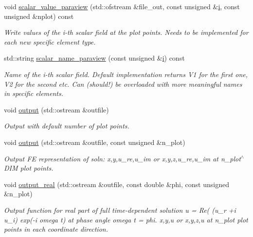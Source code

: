 \begin{DoxyCompactItemize}
void \hyperlink{classoomph_1_1HelmholtzEquations_a7387cf17f2925a89a4ac9de760c4b359}{scalar\+\_\+value\+\_\+paraview} (std\+::ofstream \&file\+\_\+out, const unsigned \&\hyperlink{cfortran_8h_adb50e893b86b3e55e751a42eab3cba82}{i}, const unsigned \&nplot) const
\begin{DoxyCompactList}\small\item\em Write values of the i-\/th scalar field at the plot points. Needs to be implemented for each new specific element type. \end{DoxyCompactList}\item 
std\+::string \hyperlink{classoomph_1_1HelmholtzEquations_a19eb3c554208f7136c5a3a7703e94693}{scalar\+\_\+name\+\_\+paraview} (const unsigned \&\hyperlink{cfortran_8h_adb50e893b86b3e55e751a42eab3cba82}{i}) const
\begin{DoxyCompactList}\small\item\em Name of the i-\/th scalar field. Default implementation returns V1 for the first one, V2 for the second etc. Can (should!) be overloaded with more meaningful names in specific elements. \end{DoxyCompactList}\item 
void \hyperlink{classoomph_1_1HelmholtzEquations_ad06140cef8a602246cf45f1b38d201e3}{output} (std\+::ostream \&outfile)
\begin{DoxyCompactList}\small\item\em Output with default number of plot points. \end{DoxyCompactList}\item 
void \hyperlink{classoomph_1_1HelmholtzEquations_a63c04aa6b9ee38cb75417b2de9e45f24}{output} (std\+::ostream \&outfile, const unsigned \&n\+\_\+plot)
\begin{DoxyCompactList}\small\item\em Output FE representation of soln\+: x,y,u\+\_\+re,u\+\_\+im or x,y,z,u\+\_\+re,u\+\_\+im at n\+\_\+plot$^\wedge$\+D\+IM plot points. \end{DoxyCompactList}\item 
void \hyperlink{classoomph_1_1HelmholtzEquations_a391092039be116f402d1495284b49e1e}{output\+\_\+real} (std\+::ostream \&outfile, const double \&phi, const unsigned \&n\+\_\+plot)
\begin{DoxyCompactList}\small\item\em Output function for real part of full time-\/dependent solution u = Re( (u\+\_\+r +i u\+\_\+i) exp(-\/i omega t) at phase angle omega t = phi. x,y,u or x,y,z,u at n\+\_\+plot plot points in each coordinate direction. \end{DoxyCompactList}\item 

\end{DoxyCompactItemize}
